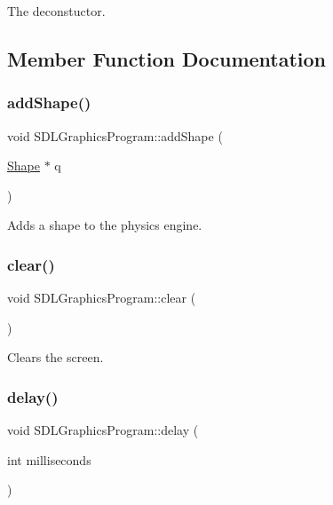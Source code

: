 The deconstuctor. 



\subsection{Member Function Documentation}
\mbox{\label{class_s_d_l_graphics_program_add4ecb861302c3e883e5630aa86221ce}} 
\subsubsection{\texorpdfstring{addShape()}{addShape()}}
{\footnotesize\ttfamily void S\+D\+L\+Graphics\+Program\+::add\+Shape (\begin{DoxyParamCaption}\item[{\mbox{\hyperlink{class_shape}{Shape}} $\ast$}]{q }\end{DoxyParamCaption})}



Adds a shape to the physics engine. 

\mbox{\label{class_s_d_l_graphics_program_a56942edfd4c5f45334ba55adb2558d35}} 
\subsubsection{\texorpdfstring{clear()}{clear()}}
{\footnotesize\ttfamily void S\+D\+L\+Graphics\+Program\+::clear (\begin{DoxyParamCaption}{ }\end{DoxyParamCaption})}



Clears the screen. 

\mbox{\label{class_s_d_l_graphics_program_a299c62853b3f28fc3930880fc4c128ba}} 
\subsubsection{\texorpdfstring{delay()}{delay()}}
{\footnotesize\ttfamily void S\+D\+L\+Graphics\+Program\+::delay (\begin{DoxyParamCaption}\item[{int}]{milliseconds }\end{DoxyParamCaption})}



